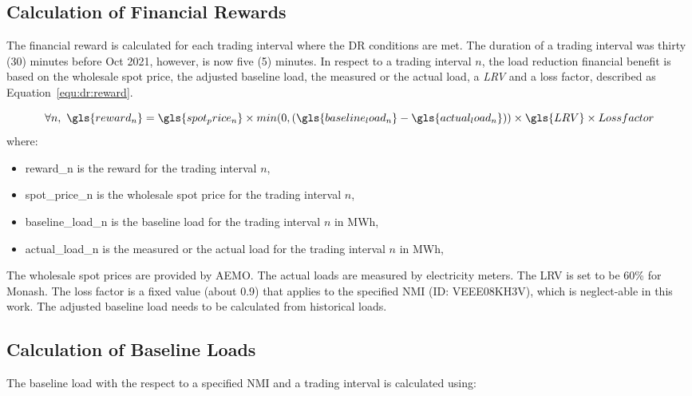 \subsection{Calculation of Financial Rewards}
\label{dr:rewards:rewards}

The financial reward is calculated for each trading interval where the \gls{DR} conditions are met. The duration of a trading interval was thirty (30) minutes before Oct 2021, however, is now five (5) minutes. In respect to a trading interval $n$, the load reduction financial benefit is based on the wholesale spot price, the adjusted baseline load, the measured or the actual load, a \textit{\gls{LRV}} and a loss factor, described as Equation~\ref{equ:dr:reward}. 

\begin{equation}
	\label{equ:dr:reward}
	\forall n, ~ \gls{reward_n}	= \gls{spot_price_n} \times min(0,  ( \gls{baseline_load_n} - \gls{actual_load_n} )) \times \gls{LRV} \times Loss factor
\end{equation}
where:
\begin{itemize}
	\item \gls{reward_n} is the reward for the trading interval $n$,
	
	\item \gls{spot_price_n} is the wholesale spot price for the trading interval $n$,
	
	\item \gls{baseline_load_n} is the baseline load for the trading interval $n$ in MWh,
	
	\item \gls{actual_load_n} is the measured or the actual load for the trading interval $n$ in MWh,
	
\end{itemize}
The wholesale spot prices are provided by \gls{AEMO}. The actual loads are measured by electricity meters. The \gls{LRV} is set to be 60\% for Monash. The loss factor is a fixed value (about 0.9) that applies to the specified NMI (ID: VEEE08KH3V), which is neglect-able in this work. The adjusted baseline load needs to be calculated from historical loads. 

\subsection{Calculation of Baseline Loads}
\label{dr:rewards:baseline}

The baseline load with the respect to a specified NMI and a trading interval is calculated using:

